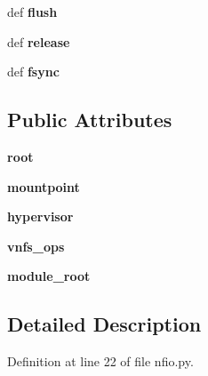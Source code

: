 \begin{DoxyCompactItemize}
\item 
\hypertarget{classnfio_1_1Nfio_a11131bfcad8345d6caac6e8a0e9edf8e}{def {\bfseries flush}}\label{classnfio_1_1Nfio_a11131bfcad8345d6caac6e8a0e9edf8e}

\item 
\hypertarget{classnfio_1_1Nfio_aa8899667347dbe1c3176f25fa29a9621}{def {\bfseries release}}\label{classnfio_1_1Nfio_aa8899667347dbe1c3176f25fa29a9621}

\item 
\hypertarget{classnfio_1_1Nfio_a9839b74eb4091fcfaf5a7d35ad20ec25}{def {\bfseries fsync}}\label{classnfio_1_1Nfio_a9839b74eb4091fcfaf5a7d35ad20ec25}

\end{DoxyCompactItemize}
\subsection*{Public Attributes}
\begin{DoxyCompactItemize}
\item 
\hypertarget{classnfio_1_1Nfio_aaebb8f6c5190c41a25e5415c56a5e6dd}{{\bfseries root}}\label{classnfio_1_1Nfio_aaebb8f6c5190c41a25e5415c56a5e6dd}

\item 
\hypertarget{classnfio_1_1Nfio_a89d8c89f78cdec45abb64091de093e8b}{{\bfseries mountpoint}}\label{classnfio_1_1Nfio_a89d8c89f78cdec45abb64091de093e8b}

\item 
\hypertarget{classnfio_1_1Nfio_a6ec5f975fcf5378e65352c2f8b4e59d4}{{\bfseries hypervisor}}\label{classnfio_1_1Nfio_a6ec5f975fcf5378e65352c2f8b4e59d4}

\item 
\hypertarget{classnfio_1_1Nfio_a844cfc22cc19b0a22059d3f4adeb3a0e}{{\bfseries vnfs\-\_\-ops}}\label{classnfio_1_1Nfio_a844cfc22cc19b0a22059d3f4adeb3a0e}

\item 
\hypertarget{classnfio_1_1Nfio_a7f13fbcef42434fff50bbe6f3f301e83}{{\bfseries module\-\_\-root}}\label{classnfio_1_1Nfio_a7f13fbcef42434fff50bbe6f3f301e83}

\end{DoxyCompactItemize}


\subsection{Detailed Description}


Definition at line 22 of file nfio.\-py.




